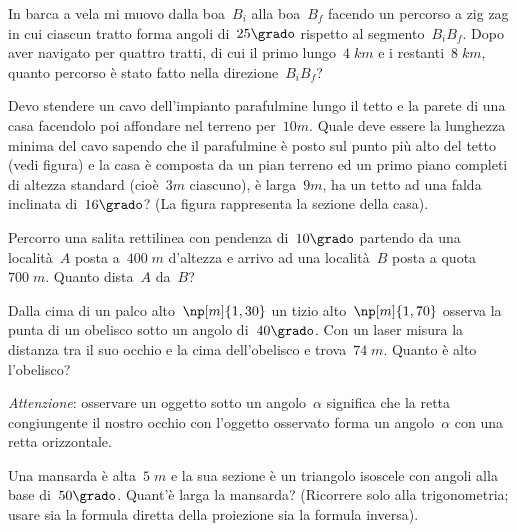 \begin{esercizio}[\Ast]
\label{ese:C.46}
In barca a vela mi muovo dalla boa~$B_i$ alla boa~$B_f$ facendo un percorso a zig zag in cui ciascun tratto forma angoli di~$25\grado$
rispetto al segmento~$B_i B_f$. Dopo aver navigato per quattro tratti, di cui il primo lungo~$4\;\unit{km}$ e i restanti~$8\;\unit{km}$,
quanto percorso è stato fatto nella direzione~$B_i B_f$?
\begin{center}
 
\end{center}
\end{esercizio}
\begin{multicols}{2}
\begin{esercizio}[\Ast]
\label{ese:C.47}
Devo stendere un cavo dell'impianto parafulmine lungo il tetto e la parete di una casa facendolo poi affondare nel terreno per~$10\unit{m}$.
Quale deve essere la lunghezza minima del cavo sapendo che il parafulmine è posto sul punto più alto del tetto (vedi figura) e la casa è
composta da un pian terreno ed un primo piano completi di altezza standard (cioè~$3\unit{m}$ ciascuno), è larga~$9\unit{m}$,
ha un tetto ad una falda inclinata di~$16\grado$? (La figura rappresenta la sezione della casa).
\begin{center}
 
\end{center}
\end{esercizio}


 \begin{esercizio}[\Ast]
\label{ese:C.48}
Percorro una salita rettilinea con pendenza di~$10\grado$ partendo da una località~$A$ posta a~$400\;\unit{m}$ d'altezza e arrivo ad
una località~$B$ posta a quota~$700\;\unit{m}$. Quanto dista~$A$ da~$B$?
\end{esercizio}

\begin{esercizio}[\Ast]
\label{ese:C.49}
Dalla cima di un palco alto~$\np[m]{1,30}$ un tizio alto~$\np[m]{1,70}$ osserva la punta di un obelisco sotto un angolo di~$40\grado$.
Con un laser misura la distanza tra il suo occhio e la cima dell'obelisco e trova~$74\;\unit{m}$. Quanto è alto l'obelisco?

\emph{Attenzione}: osservare un oggetto sotto un angolo~$\alpha$ significa che la retta congiungente il nostro occhio con l'oggetto osservato
forma un angolo~$\alpha$ con una retta orizzontale.
\end{esercizio}

\begin{esercizio}[\Ast]
\label{ese:C.50}
Una mansarda è alta~$5\;\unit{m}$ e la sua sezione è un triangolo isoscele con angoli alla base di~$50\grado$. Quant'è larga la mansarda?
(Ricorrere solo alla trigonometria; usare sia la formula diretta della proiezione sia la formula inversa).
\end{esercizio}
\end{multicols}


